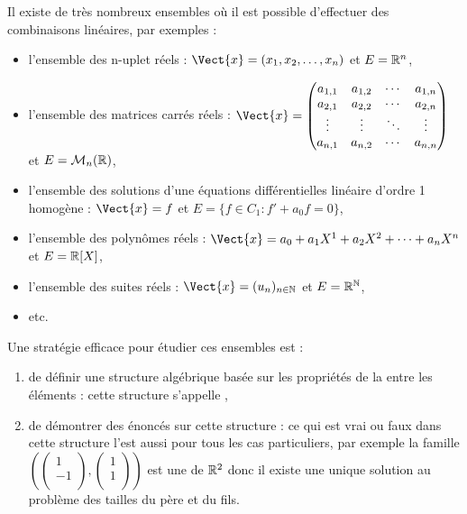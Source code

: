 \documentclass{book}
\begin{document}
\begin{Texte}
Il existe de très nombreux ensembles  où il est possible d'effectuer des combinaisons linéaires, par exemples :
\begin{itemize}
\item l'ensemble des n-uplet réels : $\Vect{x}=(x_{1},x_{2},\ldots ,x_{n})$ et $E=\mathbb{R}^n$,
\item l'ensemble des matrices carrés réels : $\Vect{x}=\begin{pmatrix}
a_{1,1} & a_{1,2} & \cdots & a_{1,n}\\
a_{2,1} & a_{2,2} & \cdots & a_{2,n}\\
\vdots & \vdots & \ddots & \vdots\\
a_{n,1} & a_{n,2} & \cdots & a_{n,n}\\
\end{pmatrix}$ et $E=\mathcal{M}_{n}(\mathbb{R})$,
\item l'ensemble des solutions d'une équations différentielles linéaire d'ordre 1 homogène : $\Vect{x}=f$  et $E=\{f\in C_1 :  f'+a_{0}f=0\}$,
\item l'ensemble des polynômes réels : $\Vect{x}= a_{0}+a_{1}X^{1}+a_{2}X^{2}+\dots +a_{n}X^{n}$ et $E=\mathbb{R}[X]$,
\item l'ensemble des suites réels : $\Vect{x}=(u_{n})_{n\in \mathbb {N} }$ et $E=\mathbb{R}^{\mathbb{N}}$,
\item etc.
\end{itemize}

Une stratégie efficace pour étudier ces ensembles est :
\begin{enumerate}
\item de définir une structure algébrique basée sur les propriétés de la  entre les éléments : cette structure s'appelle ,
\item de démontrer des énoncés sur cette structure  : ce qui est vrai ou faux dans cette structure  l'est aussi pour tous les cas particuliers, par exemple la famille $(\begin{pmatrix}
 1    \\
 -1   \\
\end{pmatrix},\begin{pmatrix}
 1   \\
  1  \\
\end{pmatrix})$ est une  de $\mathbb{R}^2$ donc il existe une unique solution au problème des tailles du père et du fils. 
\end{enumerate}
\end{Texte}
\end{document}
